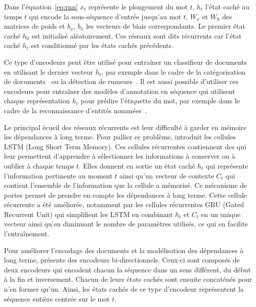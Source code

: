 Dans l'équation~\ref{eq:rnn} $x_t$ représente le plongement du mot $t$, $h_t$ l'état caché au temps $t$ qui encode la sous-séquence d'entrée jusqu'au mot $t$, $W_x$ et $W_h$ des matrices de poids et $b_x$, $b_h$ les vecteurs de biais correspondants.
Le premier état caché $h_0$ est initialisé aléatoirement.
Ces réseaux sont dits récurrents car l'état caché $h_t$ est conditionné par les états cachés précédents.

Ce type d'encodeurs peut être utilisé pour entraîner un classifieur de documents en utilisant le dernier vecteur $h_t$, par exemple dans le cadre de la catégorisation de documents~\cite{wang_disconnected_2018} ou la détection de rumeurs~\cite{ma_detecting_2016}.
Il est aussi possible d'utiliser ces encodeurs pour entraîner des modèles d'annotation en séquence qui utilisent chaque représentation $h_t$ pour prédire l'étiquette du mot, par exemple dans le cadre de la reconnaissance d'entités nommées~\cite{zukov-gregoric_named_2018}.

Le principal écueil des réseaux récurrents est leur difficulté à garder en mémoire les dépendances à long terme.
Pour pallier ce problème, \citet{hochreiter_long_1997}  introduit les cellules LSTM (Long Short Term Memory).
Ces cellules récurrentes contiennent des  qui leur permettent d'apprendre à sélectionner les informations à conserver ou à oublier à chaque temps $t$.
Elles donnent en sortie un état caché $h_t$ qui représente l'information pertinente au moment $t$ ainsi qu'un vecteur de contexte $C_t$ qui contient l'ensemble de l'information que la cellule a mémorisé.
Ce mécanisme de portes permet de prendre en compte les dépendances à long terme.
Cette cellule récurrente a été améliorée, notamment par les cellules récurrentes GRU (Gated Recurrent Unit)\cite{cho_learning_2014} qui simplifient les LSTM en combinant $h_t$ et $C_t$ en un unique vecteur ainsi qu'en diminuant le nombre de paramètres utilisés, ce qui en facilite l'entraînement.

Pour améliorer l'encodage des documents et la modélisation des dépendances à long terme, \citet{schuster_bidirectional_1997} présente des encodeurs bi-directionnels.
Ceux-ci sont composés de deux encodeurs qui encodent chacun la séquence dans un sens différent, du début à la fin et inversement.
Chacun de leurs états cachés sont ensuite concaténés pour n'en former qu'un. Ainsi, les états cachés de ce type d'encodeur représentent la séquence entière centrée sur le mot $t$.


